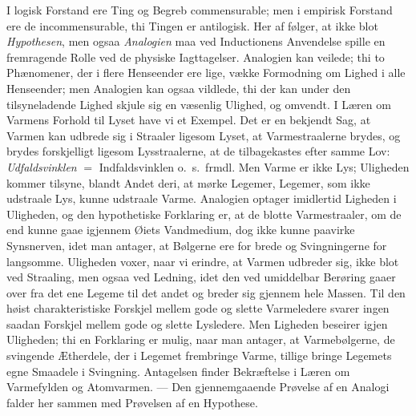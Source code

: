 \documentclass[12pt]{book}
\newcommand{\apage}[1]{\marginnote{\footnotesize\textit{[#1]}}}
\begin{document}
I logisk Forstand ere Ting og Begreb commensurable; men i empirisk Forstand
ere de incommensurable, thi Tingen er antilogisk. Her af følger, at ikke
blot \emph{Hypothesen}, men ogsaa \emph{Analogien} maa \apage{141} ved Inductionens Anvendelse spille
en fremragende Rolle ved de physiske Iagttagelser. Analogien kan veilede;
thi to Phænomener, der i flere Henseender ere lige, vække Formodning om
Lighed i alle Henseender; men Analogien kan ogsaa vildlede, thi der kan
under den tilsyneladende Lighed skjule sig en væsenlig Ulighed, og omvendt.
I Læren om Varmens Forhold til Lyset have vi et Exempel. Det er en bekjendt
Sag, at Varmen kan udbrede sig i Straaler ligesom Lyset, at Varmestraalerne
brydes, og brydes forskjelligt ligesom Lysstraalerne, at de tilbagekastes
efter samme Lov: \emph{Udfaldsvinklen} $=$ Indfaldsvinklen o.\ s.\ frmdl. Men Varme er
ikke Lys; Uligheden kommer tilsyne, blandt Andet deri, at mørke Legemer,
Legemer, som ikke udstraale Lys, kunne udstraale Varme. Analogien optager
imidlertid Ligheden i Uligheden, og den hypothetiske Forklaring er, at de
blotte Varmestraaler, om de end kunne gaae igjennem Øiets Vandmedium, dog
ikke kunne paavirke Synsnerven, idet man antager, at Bølgerne ere for brede
og Svingningerne for langsomme. Uligheden voxer, naar vi erindre, at Varmen
udbreder sig, ikke blot ved Straaling, men ogsaa ved Ledning, idet den ved
umiddelbar Berøring gaaer over fra det ene Legeme til det andet og breder
sig gjennem hele Massen. Til den høist charakteristiske Forskjel mellem
gode og slette Varmeledere svarer ingen saadan Forskjel mellem gode og
slette Lysledere. Men Ligheden beseirer igjen Uligheden; thi en Forklaring
er mulig, naar man antager, at Varmebølgerne, de svingende Ætherdele, der i
Legemet frembringe Varme, \apage{142} tillige bringe Legemets egne Smaadele i
Svingning. Antagelsen finder Bekræftelse i Læren om Varmefylden og
Atomvarmen. --- Den gjennemgaaende Prøvelse af en Analogi falder her sammen med
Prøvelsen af en Hypothese.
\end{document}
